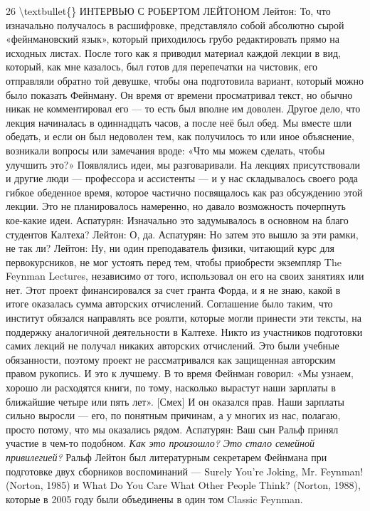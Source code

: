 \documentclass[10pt,oneside]{article}
\begin{document}
26 \textbackslash{}textbullet\{\} ИНТЕРВЬЮ С РОБЕРТОМ ЛЕЙТОНОМ Лейтон: То, что изначально получалось в расшифровке, представляло собой абсолютно сырой «фейнмановский язык», который приходилось грубо редактировать прямо на исходных листах. После того как я приводил материал каждой лекции в вид, который, как мне казалось, был готов для перепечатки на чистовик, его отправляли обратно той девушке, чтобы она подготовила вариант, который можно было показать Фейнману. Он время от времени просматривал текст, но обычно никак не комментировал его --- то есть был вполне им доволен. Другое дело, что лекция начиналась в одиннадцать часов, а после неё был обед. Мы вместе шли обедать, и если он был недоволен тем, как получилось то или иное объяснение, возникали вопросы или замечания вроде: «Что мы можем сделать, чтобы улучшить это?» Появлялись идеи, мы разговаривали. На лекциях присутствовали и другие люди --- профессора и ассистенты --- и у нас складывалось своего рода гибкое обеденное время, которое частично посвящалось как раз обсуждению этой лекции. Это не планировалось намеренно, но давало возможность почерпнуть кое-какие идеи. Аспатурян: Изначально это задумывалось в основном на благо студентов Калтеха? Лейтон: О, да. Аспатурян: Но затем это вышло за эти рамки, не так ли? Лейтон: Ну, ни один преподаватель физики, читающий курс для первокурсников, не мог устоять перед тем, чтобы приобрести экземпляр The Feynman Lectures, независимо от того, использовал он его на своих занятиях или нет. Этот проект финансировался за счет гранта Форда, и я не знаю, какой в итоге оказалась сумма авторских отчислений. Соглашение было таким, что институт обязался направлять все роялти, которые могли принести эти тексты, на поддержку аналогичной деятельности в Калтехе. Никто из участников подготовки самих лекций не получал никаких авторских отчислений. Это были учебные обязанности, поэтому проект не рассматривался как защищенная авторским правом рукопись. И это к лучшему. В то время Фейнман говорил: «Мы узнаем, хорошо ли расходятся книги, по тому, насколько вырастут наши зарплаты в ближайшие четыре или пять лет». [Смех] И он оказался прав. Наши зарплаты сильно выросли --- его, по понятным причинам, а у многих из нас, полагаю, просто потому, что мы оказались рядом. Аспатурян: Ваш сын Ральф принял участие в чем-то подобном.\emph{ Как это произошло? Это стало семейной привилегией? } Ральф Лейтон был литературным секретарем Фейнмана при подготовке двух сборников воспоминаний --- Surely You’re Joking, Mr. Feynman! (Norton, 1985) и What Do You Care What Other People Think? (Norton, 1988), которые в 2005 году были объединены в один том Classic Feynman.\par
\end{document}
